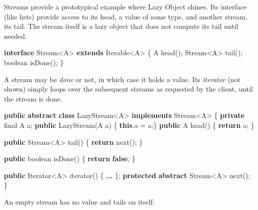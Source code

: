 \documentclass[11pt,]{article}
\newenvironment{Shaded}{}{}
\newcommand{\KeywordTok}[1]{\textcolor[rgb]{0.00,0.44,0.13}{\textbf{{#1}}}}
\newcommand{\DataTypeTok}[1]{\textcolor[rgb]{0.56,0.13,0.00}{{#1}}}
\newcommand{\FunctionTok}[1]{\textcolor[rgb]{0.02,0.16,0.49}{{#1}}}
\newcommand{\NormalTok}[1]{{#1}}
\begin{document}
Streams provide a prototypical example where Lazy Object shines. Its
interface (like lists) provide access to its head, a value of some type,
and another stream, its tail. The stream itself is a lazy object that
does not compute its tail until needed.

\begin{Shaded}
\begin{Highlighting}[]
\KeywordTok{interface} \NormalTok{Stream<A> }\KeywordTok{extends} \NormalTok{Iterable<A> \{}
  \NormalTok{A }\FunctionTok{head}\NormalTok{();}
  \NormalTok{Stream<A> }\FunctionTok{tail}\NormalTok{();}
  \DataTypeTok{boolean} \FunctionTok{isDone}\NormalTok{();}
\NormalTok{\}}
\end{Highlighting}
\end{Shaded}

A stream may be \emph{done} or not, in which case it holds a value. Its
\emph{iterator} (not shown) simply loops over the subsequent streams as
requested by the client, until the stream is done.

\begin{Shaded}
\begin{Highlighting}[]
\KeywordTok{public} \KeywordTok{abstract} \KeywordTok{class} \NormalTok{LazyStream<A> }\KeywordTok{implements} \NormalTok{Stream<A> \{}
   \KeywordTok{private} \DataTypeTok{final} \NormalTok{A a;}
   \KeywordTok{public} \FunctionTok{LazyStream}\NormalTok{(A a) \{ }\KeywordTok{this}\NormalTok{.}\FunctionTok{a} \NormalTok{= a;\}   }
   \KeywordTok{public} \NormalTok{A }\FunctionTok{head}\NormalTok{() \{}
     \KeywordTok{return} \NormalTok{a;}
   \NormalTok{\}}
   
   \KeywordTok{public} \NormalTok{Stream<A> }\FunctionTok{tail}\NormalTok{() \{}
     \KeywordTok{return} \FunctionTok{next}\NormalTok{();}
   \NormalTok{\}}
   
   \KeywordTok{public} \DataTypeTok{boolean} \FunctionTok{isDone}\NormalTok{() \{ }\KeywordTok{return} \KeywordTok{false}\NormalTok{; \}}
   
   \KeywordTok{public} \NormalTok{Iterator<A> }\FunctionTok{iterator}\NormalTok{() \{ }\KeywordTok{... }\NormalTok{\};}
   \KeywordTok{protected} \KeywordTok{abstract} \NormalTok{Stream<A> }\FunctionTok{next}\NormalTok{();}
\NormalTok{\}}
\end{Highlighting}
\end{Shaded}

An empty stream has no value and tails on itself:
\end{document}
